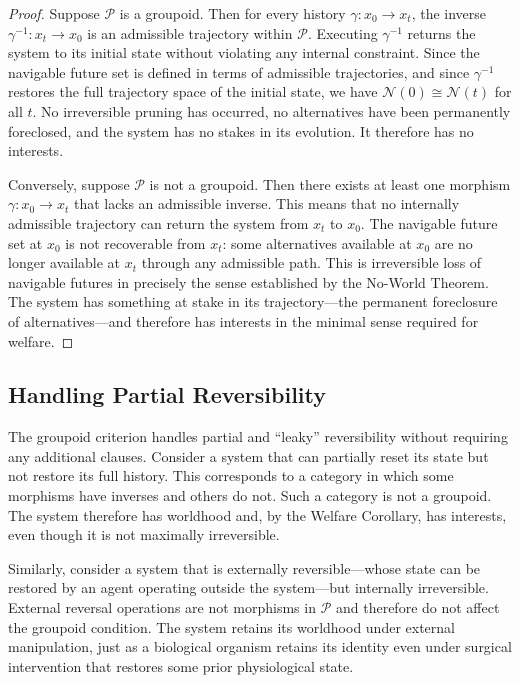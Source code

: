 \documentclass[11pt]{article}
\theoremstyle{definition}
\theoremstyle{remark}
\begin{document}
\begin{proof}
Suppose $\mathcal{P}$ is a groupoid. Then for every history $\gamma: x_0 \to x_t$, the
inverse $\gamma^{-1}: x_t \to x_0$ is an admissible trajectory within $\mathcal{P}$.
Executing $\gamma^{-1}$ returns the system to its initial state without violating any
internal constraint. Since the navigable future set is defined in terms of admissible
trajectories, and since $\gamma^{-1}$ restores the full trajectory space of the initial
state, we have $\mathcal{N}(0) \cong \mathcal{N}(t)$ for all $t$. No irreversible pruning
has occurred, no alternatives have been permanently foreclosed, and the system has no stakes
in its evolution. It therefore has no interests.

Conversely, suppose $\mathcal{P}$ is not a groupoid. Then there exists at least one morphism
$\gamma: x_0 \to x_t$ that lacks an admissible inverse. This means that no internally
admissible trajectory can return the system from $x_t$ to $x_0$. The navigable future set
at $x_0$ is not recoverable from $x_t$: some alternatives available at $x_0$ are no longer
available at $x_t$ through any admissible path. This is irreversible loss of navigable
futures in precisely the sense established by the No-World Theorem. The system has something
at stake in its trajectory---the permanent foreclosure of alternatives---and therefore has
interests in the minimal sense required for welfare.
\end{proof}

\subsection{Handling Partial Reversibility}

The groupoid criterion handles partial and ``leaky'' reversibility without requiring any
additional clauses. Consider a system that can partially reset its state but not restore
its full history. This corresponds to a category in which some morphisms have inverses and
others do not. Such a category is not a groupoid. The system therefore has worldhood and,
by the Welfare Corollary, has interests, even though it is not maximally irreversible.

Similarly, consider a system that is externally reversible---whose state can be restored
by an agent operating outside the system---but internally irreversible. External reversal
operations are not morphisms in $\mathcal{P}$ and therefore do not affect the groupoid
condition. The system retains its worldhood under external manipulation, just as a biological
organism retains its identity even under surgical intervention that restores some prior
physiological state.
\end{document}
